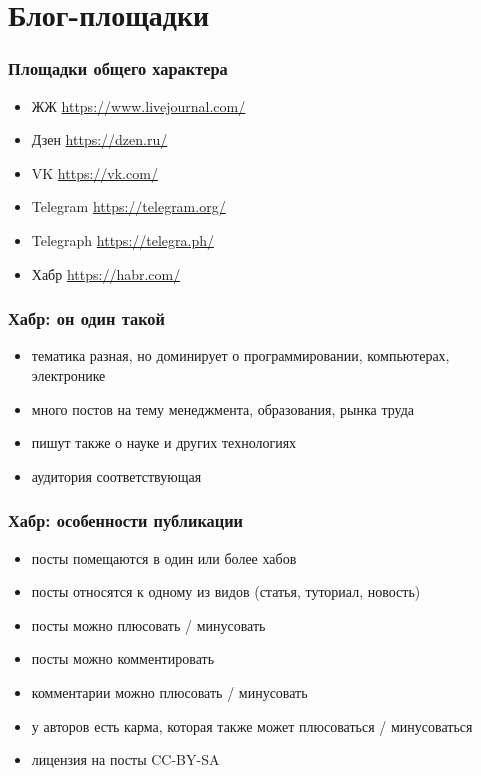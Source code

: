 \documentclass[12pt]{beamer}
\begin{document}
\section{Блог-площадки}

\begin{frame}
  \frametitle{Площадки общего характера}
  \begin{itemize}
  \item ЖЖ \url{https://www.livejournal.com/}
  \item Дзен \url{https://dzen.ru/}
  \item VK \url{https://vk.com/}
  \item Telegram \url{https://telegram.org/}
  \item Telegraph \url{https://telegra.ph/}
  \item Хабр \url{https://habr.com/}
  \end{itemize}
\end{frame}

\begin{frame}
  \frametitle{Хабр: он один такой}
  \begin{itemize}
  \item тематика разная, но доминирует о программировании, компьютерах, электронике
  \item много постов на тему менеджмента, образования, рынка труда
  \item пишут также о науке и других технологиях
  \item аудитория соответствующая
  \end{itemize}
\end{frame}

\begin{frame}
  \frametitle{Хабр: особенности публикации}
  \begin{itemize}
  \item посты помещаются в один или более хабов
  \item посты относятся к одному из видов (статья, туториал, новость)
  \item посты можно плюсовать / минусовать
  \item посты можно комментировать
  \item комментарии можно плюсовать / минусовать
  \item у авторов есть карма, которая также может плюсоваться / минусоваться
  \item лицензия на посты CC-BY-SA
  \end{itemize}
\end{frame}
\end{document}
